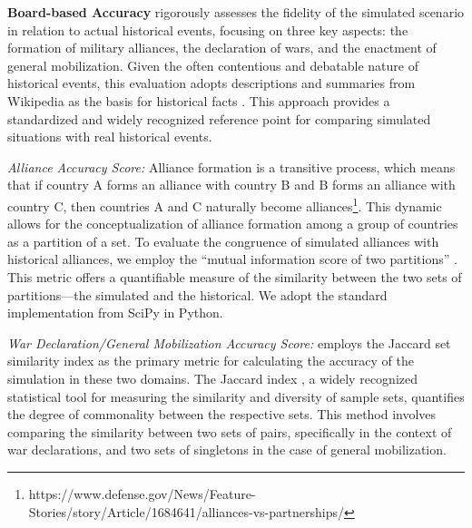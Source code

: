 \documentclass{article}
\begin{document}

\textbf{Board-based Accuracy} rigorously assesses the fidelity of the simulated scenario in relation to actual historical events, focusing on three key aspects: the formation of military alliances, the declaration of wars, and the enactment of general mobilization. Given the often contentious and debatable nature of historical events, this evaluation adopts descriptions and summaries from Wikipedia as the basis for historical facts \cite{keegan2014first}. This approach provides a standardized and widely recognized reference point for comparing simulated situations with real historical events.

\textit{Alliance Accuracy Score:} Alliance formation is a transitive process, which means that if country A forms an alliance with country B and B forms an alliance with country C, then countries A and C naturally become alliances\footnote{https://www.defense.gov/News/Feature-Stories/story/Article/1684641/alliances-vs-partnerships/}. This dynamic allows for the conceptualization of alliance formation among a group of countries as a partition of a set. To evaluate the congruence of simulated alliances with historical alliances, we employ the ``mutual information score of two partitions'' \cite{vinh2010bailey}. This metric offers a quantifiable measure of the similarity between the two sets of partitions---the simulated and the historical. We adopt the standard implementation from SciPy in Python.

\textit{War Declaration/General Mobilization Accuracy Score:} employs the Jaccard set similarity index as the primary metric for calculating the accuracy of the simulation in these two domains. The Jaccard index \cite{rajaraman2011mining}, a widely recognized statistical tool for measuring the similarity and diversity of sample sets, quantifies the degree of commonality between the respective sets. This method involves comparing the similarity between two sets of pairs, specifically in the context of war declarations, and two sets of singletons in the case of general mobilization. 
\end{document}
